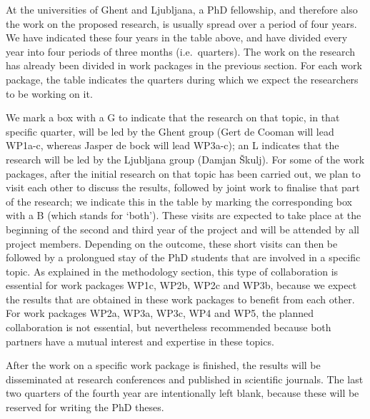 \documentclass[11pt,dvipsnames,usenames,a4paper]{article}
\begin{document}
At the universities of Ghent and Ljubljana, a PhD fellowship, and therefore also the work on the proposed research, is usually spread over a period of four years.
We have indicated these four years in the table above, and have divided every year into four periods of three months (i.e.~quarters).
The work on the research has already been divided in work packages in the previous section.
For each work package, the table indicates the quarters during which we expect the researchers to be working on it.

We mark a box with a G to indicate that the research on that topic, in that specific quarter, will be led by the Ghent group (Gert de Cooman will lead WP1a-c, whereas Jasper de bock will lead WP3a-c); an L indicates that the research will be led by the Ljubljana group (Damjan \v{S}kulj). For some of the work packages, after the initial research on that topic has been carried out, we plan to visit each other to discuss the results, followed by joint work to finalise that part of the research; we indicate this in the table by marking the corresponding box with a B (which stands for `both'). These visits are expected to take place at the beginning of the second and third year of the project and will be attended by all project members. Depending on the outcome, these short visits can then be followed by a prolongued stay of the PhD students that are involved in a specific topic. As explained in the methodology section, this type of collaboration is essential for work packages WP1c, WP2b, WP2c and WP3b, because we expect the results that are obtained in these work packages to benefit from each other. For work packages WP2a, WP3a, WP3c, WP4 and WP5, the planned collaboration is not essential, but nevertheless recommended because both partners have a mutual interest and expertise in these topics.



After the work on a specific work package is finished, the results will be disseminated at research conferences and published in scientific journals. 
The last two quarters of the fourth year are intentionally left blank, because these will be reserved for writing the PhD theses. 

\vspace{-10pt}
\end{document}
